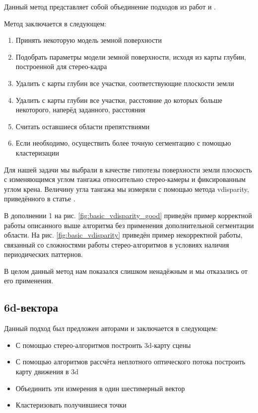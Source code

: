 \documentclass[aps,%
14pt,%
final,%
oneside,
onecolumn,%
musixtex, %
superscriptaddress,%
centertags]{extarticle} %
\begin{document}
Данный метод представляет собой объединение подходов из работ \cite{labayrade2002real} и \cite{broggi2006single}.

Метод заключается в следующем:
\begin{enumerate}
    \item Принять некоторую модель земной поверхности
    \item Подобрать параметры модели земной поверхности, исходя из карты глубин, построенной для стерео-кадра
    \item Удалить с карты глубин все участки, соответствующие плоскости земли
    \item Удалить с карты глубин все участки, расстояние до которых больше некоторого, наперёд заданного, расстояния
    \item Считать оставшиеся области препятствиями
    \item Если необходимо, осуществить более точную сегментацию с помощью кластеризации
\end{enumerate}

Для нашей задачи мы выбрали в качестве гипотезы поверхности земли плоскость с изменяющимся углом тангажа относительно стерео-камеры и фиксированным углом крена. Величину угла тангажа мы измеряли с помощью метода vdisparity, приведённого в статье \cite{labayrade2002real}.

В дополнении 1 на рис. \ref{fig:basic_vdisparity_good} приведён пример корректной работы описанного выше алгоритма без применения дополнительной сегментации области. На рис. \ref{fig:basic_vdisparity} приведён пример некорректной работы, связанный со сложностями работы стерео-алгоритмов в условиях наличия периодических паттернов. 

В целом данный метод нам показался слишком ненадёжным и мы отказались от его применения.

\subsection{ 6d-вектора }

Данный подход был предложен авторами \cite{franke20056d} и заключается в следующем:
\begin{itemize}
     \item С помощью стерео-алгоритмов построить 3d-карту сцены
     \item С помощью алгоритмов рассчёта неплотного оптического потока построить карту движения в 3d
     \item Объединить эти измерения в один шестимерный вектор
     \item Кластеризовать получившиеся точки
\end{itemize}
\end{document}
